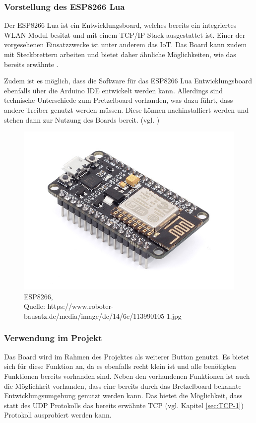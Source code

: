 \subsubsection{Vorstellung des ESP8266 Lua}        
\label{sec:Vorstellung des ESP8266} 

Der ESP8266 Lua ist ein Entwicklungsboard, welches bereits ein integriertes WLAN Modul besitzt und mit einem \ac{TCP}/\ac{IP} Stack ausgestattet ist. Einer der vorgesehenen Einsatzzwecke ist unter anderem das \ac{IoT}. Das Board kann zudem mit Steckbrettern arbeiten und bietet daher ähnliche Möglichkeiten, wie das bereits erwähnte . 

Zudem ist es möglich, dass die Software für das ESP8266 Lua Entwicklungsboard ebenfalls über die Arduino \ac{IDE} entwickelt werden kann. Allerdings sind technische Unterschiede zum Pretzelboard vorhanden, was dazu führt, dass andere Treiber genutzt werden müssen. 
Diese können nachinstalliert werden und stehen dann zur Nutzung des Boards bereit. (vgl. \cite{Carius.15.01.2017}\cite{.d})

\begin{figure}[!htb]
	\centering
	\includegraphics[scale=0.4]{ESP.jpg}
	\caption[ESP8266]{ESP8266,\\ Quelle: https://www.roboter-bausatz.de/media/image/dc/14/6e/113990105-1.jpg}
\end{figure}

\subsubsection{Verwendung im Projekt}        
\label{sec:Verwendung des ESP8266} 
Das Board wird im Rahmen des Projektes als weiterer Button genutzt. Es bietet sich für diese Funktion an, da es ebenfalls recht klein ist und alle benötigten Funktionen bereits vorhanden sind. Neben den vorhandenen Funktionen ist auch die Möglichkeit vorhanden, dass eine bereits durch das Bretzelboard bekannte Entwicklungsumgebung genutzt werden kann. Das bietet die Möglichkeit, dass statt des \ac{UDP} Protokolls das bereits erwähnte \ac{TCP} (vgl. Kapitel \ref{sec:TCP-1}) Protokoll ausprobiert werden kann. 


